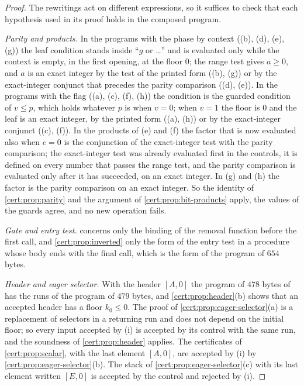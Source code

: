 \begin{proof}
The rewritings act on different expressions, so it suffices to check that each
hypothesis used in its proof holds in the composed program.

\emph{Parity and products.} In the programs with the phase by context ((b),
(d), (e), (g)) the leaf condition stands inside ``$g$ or \dots'' and is
evaluated only while the context is empty, in the first opening, at the floor
$0$; the range test gives $a\ge 0$, and $a$ is an exact integer by the test of
the printed form ((b), (g)) or by the exact-integer conjunct that precedes the
parity comparison ((d), (e)). In the programs with the flag ((a), (c), (f),
(h)) the condition is the guarded condition of $v\le p$, which holds whatever
$p$ is when $v=0$; when $v=1$ the floor is $0$ and the leaf is an exact
integer, by the printed form ((a), (h)) or by the exact-integer conjunct ((c),
(f)). In the products of (e) and (f) the factor that is now evaluated also when
$e=0$ is the conjunction of the exact-integer test with the parity comparison;
the exact-integer test was already evaluated first in the controls, it is
defined on every number that passes the range test, and the parity comparison
is evaluated only after it has succeeded, on an exact integer. In (g) and (h)
the factor is the parity comparison on an exact integer. So the identity of
\cref{cert:prop:parity} and the argument of \cref{cert:prop:bit-products}
apply, the values of the guards agree, and no new operation fails.

\emph{Gate and entry test.}  concerns only the binding
of the removal function before the first call, and \cref{cert:prop:inverted}
only the form of the entry test in a procedure whose body ends with the final
call, which is the form of the program of $654$ bytes.

\emph{Header and eager selector.} With the header $[A,0]$ the program of $478$
bytes of  has the runs of the program of $479$ bytes, and
\cref{cert:prop:header}(b) shows that an accepted header has a floor
$k_0\le 0$. The proof of \cref{cert:prop:eager-selector}(a) is a replacement of
selectors in a returning run and does not depend on the initial floor; so every
input accepted by (i) is accepted by its control with the same run, and the
soundness of \cref{cert:prop:header} applies. The certificates of
\cref{cert:prop:scalar}, with the last element $[A,0]$, are accepted by (i) by
\cref{cert:prop:eager-selector}(b). The stack of
\cref{cert:prop:eager-selector}(c) with its last element written $[E,0]$ is
accepted by the control and rejected by (i).
\end{proof}

